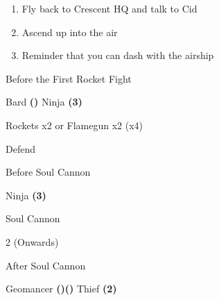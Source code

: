 \begin{paracol}{2}
\begin{enumerate}[resume]
    \item Fly back to Crescent HQ and talk to Cid
    \item Ascend up into the air
    \item Reminder that you can dash with the airship
\end{enumerate}

\begin{menu}{Before the First Rocket Fight}
    \varwb
    \begin{jobMenu}
        \bartz Bard \textbf{(\pointUp)} \ability{!\black}
        \lenna Ninja \textbf{(3\pointRight)} \ability{!\black}
    \end{jobMenu}
    \varwe
\end{menu}

\begin{encounter}{Rockets x2 or Flamegun x2 (x4)}
	\varwb
	\begin{notes}
		\item {}
	\end{notes}
	\begin{round}{1}
		\faris \leftCommand{\throw} \then \thunderScroll
        \galuf Defend
        \lenna \leftCommand{\throw} \then \thunderScroll
        \bartz \rightCommand{\black} \then \bolt \space \then {}
	\end{round}
	\varwe
\end{encounter}

\begin{menu}{Before Soul Cannon}
    \varwb
    \begin{jobMenu}
        \galuf Ninja \textbf{(3\pointRight)} \ability{!\white}
    \end{jobMenu}
    \varwe
\end{menu}

\begin{boss}{Soul Cannon}
	\varwb
	\begin{round}{1}
        \faris \leftCommand{\throw} \then \thunderScroll
        \lenna \leftCommand{\throw} \then \thunderScroll
        \galuf \leftCommand{\throw} \then \thunderScroll
        \bartz \rightCommand{\black} \then \bolt
	\end{round}
    \begin{round}{2 (Onwards)}
        \bartz \rightCommand{\black} \then \bolt
        \everyoneElse \leftCommand{\throw} \then \thunderScroll
	\end{round}
	\varwe
\end{boss}

\begin{menu}{After Soul Cannon}
    \varwb
    \begin{jobMenu}
        \faris Geomancer \textbf{(\pointUp)(\pointLeft)}
        \bartz Thief \textbf{(2\pointRight)} \ability{!\escape}
    \end{jobMenu}
    \varwe
\end{menu}

\end{paracol}